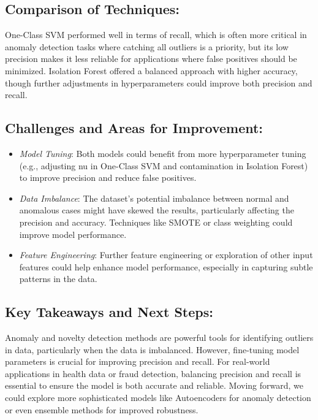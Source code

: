 \documentclass[11pt]{article}
\providecommand{\tightlist}{%
      \setlength{\itemsep}{0pt}\setlength{\parskip}{0pt}}
\begin{document}
\subsection{Comparison of Techniques:}\label{comparison-of-techniques}

One-Class SVM performed well in terms of recall, which is often more
critical in anomaly detection tasks where catching all outliers is a
priority, but its low precision makes it less reliable for applications
where false positives should be minimized. Isolation Forest offered a
balanced approach with higher accuracy, though further adjustments in
hyperparameters could improve both precision and recall.

\subsection{Challenges and Areas for
Improvement:}\label{challenges-and-areas-for-improvement}

\begin{itemize}
\tightlist
\item
  \emph{Model Tuning}: Both models could benefit from more
  hyperparameter tuning (e.g., adjusting nu in One-Class SVM and
  contamination in Isolation Forest) to improve precision and reduce
  false positives.
\item
  \emph{Data Imbalance}: The dataset's potential imbalance between
  normal and anomalous cases might have skewed the results, particularly
  affecting the precision and accuracy. Techniques like SMOTE or class
  weighting could improve model performance.
\item
  \emph{Feature Engineering}: Further feature engineering or exploration
  of other input features could help enhance model performance,
  especially in capturing subtle patterns in the data.
\end{itemize}

\subsection{Key Takeaways and Next
Steps:}\label{key-takeaways-and-next-steps}

Anomaly and novelty detection methods are powerful tools for identifying
outliers in data, particularly when the data is imbalanced. However,
fine-tuning model parameters is crucial for improving precision and
recall. For real-world applications in health data or fraud detection,
balancing precision and recall is essential to ensure the model is both
accurate and reliable. Moving forward, we could explore more
sophisticated models like Autoencoders for anomaly detection or even
ensemble methods for improved robustness.
\end{document}

